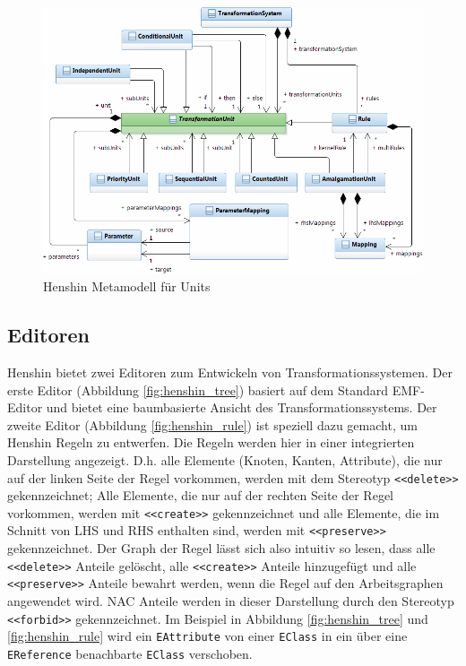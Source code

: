 \begin{figure}[h!]
  \centering
  \includegraphics[width=1.0\textwidth]{images/henshin_metamodel_units.png}
  \caption{Henshin Metamodell für Units}
  \label{fig:henshin_metamodel_units}
\end{figure}

\subsection{Editoren}

Henshin bietet zwei Editoren zum Entwickeln von Transformationssystemen. Der erste Editor (Abbildung
\ref{fig:henshin_tree}) basiert auf dem Standard EMF-Editor und bietet eine baumbasierte Ansicht des
Transformationssystems. Der zweite Editor (Abbildung \ref{fig:henshin_rule}) ist speziell dazu
gemacht, um Henshin Regeln zu entwerfen. Die Regeln werden hier in einer integrierten Darstellung
angezeigt. D.h. alle Elemente (Knoten, Kanten, Attribute), die nur auf der linken Seite der Regel
vorkommen, werden mit dem Stereotyp \texttt{<<delete>>} gekennzeichnet; Alle Elemente, die nur auf
der rechten Seite der Regel vorkommen, werden mit \texttt{<<create>>} gekennzeichnet und alle
Elemente, die im Schnitt von LHS und RHS enthalten sind, werden mit \texttt{<<preserve>>}
gekennzeichnet. Der Graph der Regel lässt sich also intuitiv so lesen, dass alle \texttt{<<delete>>} Anteile gelöscht,
alle \texttt{<<create>>}  Anteile hinzugefügt und alle \texttt{<<preserve>>} Anteile bewahrt werden,
wenn die Regel auf den Arbeitsgraphen angewendet wird. NAC Anteile werden in dieser Darstellung
durch den Stereotyp \texttt{<<forbid>>} gekennzeichnet. Im Beispiel in Abbildung
\ref{fig:henshin_tree} und \ref{fig:henshin_rule} wird ein \texttt{EAttribute} von einer
\texttt{EClass} in ein über eine \texttt{EReference} benachbarte \texttt{EClass} verschoben.

